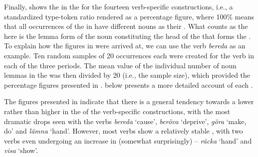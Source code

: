 \documentclass[output=paper]{langscibook}
\begin{document}
Finally,  shows the  in the  for the fourteen verb-specific constructions, i.e., a standardized type-token ratio rendered as a percentage figure, where 100\% means that all occurrences of the  in  have different nouns as their . What counts as the  here is the lemma form of the noun constituting the head of the  that forms the . To explain how the figures in  were arrived at, we can use the verb \textit{bereda} as an example. Ten random samples of 20 occurrences each were created for the verb in each of the three periods. The mean value of the individual number of noun lemmas in the  was then divided by 20 (i.e., the sample size), which provided the percentage figures presented in .  below presents a more detailed account of each .



The figures presented in  indicate that there is a general tendency towards a lower rather than higher  in the  of the verb-specific constructions, with the most dramatic drops seen with the verbs \textit{bereda} ‘cause’, \textit{beröva} ‘deprive’, \textit{göra} ‘make, do’ and \textit{lämna} ‘hand’. However, most verbs show a relatively stable , with two verbs even undergoing an increase in  (somewhat surprisingly) – \textit{räcka} ‘hand’ and \textit{visa} ‘show’.
\end{document}
